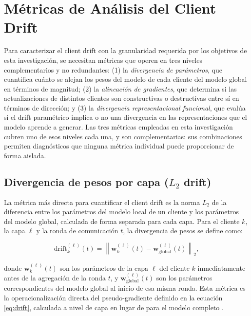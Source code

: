 \section{M\'etricas de An\'alisis del Client Drift}

Para caracterizar el client drift con la granularidad requerida por los objetivos de esta
investigación, se necesitan métricas que operen en tres niveles complementarios y no
redundantes: (1) la \textit{divergencia de parámetros}, que cuantifica cuánto se alejan los
pesos del modelo de cada cliente del modelo global en términos de magnitud; (2) la
\textit{alineación de gradientes}, que determina si las actualizaciones de distintos clientes
son constructivas o destructivas entre sí en términos de dirección; y (3) la
\textit{divergencia representacional funcional}, que evalúa si el drift paramétrico implica
o no una divergencia en las representaciones que el modelo aprende a generar. Las tres métricas
empleadas en esta investigación cubren uno de esos niveles cada una, y son complementarias:
sus combinaciones permiten diagnósticos que ninguna métrica individual puede proporcionar de
forma aislada.

\subsection{Divergencia de pesos por capa (\texorpdfstring{$L_2$}{L2} drift)}

La métrica más directa para cuantificar el client drift es la norma $L_2$ de la diferencia
entre los parámetros del modelo local de un cliente y los parámetros del modelo global,
calculada de forma separada para cada capa. Para el cliente $k$, la capa $\ell$ y la ronda de
comunicación $t$, la divergencia de pesos se define como:

\begin{equation}
  \text{drift}_k^{(\ell)}(t) = \left\| \mathbf{w}_k^{(\ell)}(t) -
  \mathbf{w}_{\text{global}}^{(\ell)}(t) \right\|_2,
  \label{eq:l2drift}
\end{equation}

donde $\mathbf{w}_k^{(\ell)}(t)$ son los parámetros de la capa $\ell$ del cliente $k$
inmediatamente antes de la agregación de la ronda $t$, y $\mathbf{w}_{\text{global}}^{(\ell)}(t)$
son los parámetros correspondientes del modelo global al inicio de esa misma ronda. Esta métrica
es la operacionalización directa del pseudo-gradiente definido en la ecuación \eqref{eq:drift},
calculada a nivel de capa en lugar de para el modelo completo \cite{son2022comparisons}.

